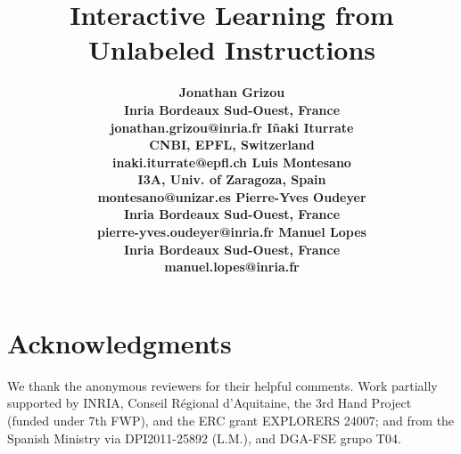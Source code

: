 \documentclass[]{article}
\title{Interactive Learning from Unlabeled Instructions}
\author{
\bf{Jonathan Grizou} \\ Inria Bordeaux Sud-Ouest, France \\ jonathan.grizou@inria.fr
\And \bf{I\~naki Iturrate} \\ CNBI, EPFL, Switzerland \\ inaki.iturrate@epfl.ch
\AND \bf{Luis Montesano} \\ I3A, Univ. of Zaragoza, Spain \\ montesano@unizar.es
\And \bf{Pierre-Yves Oudeyer} \\ Inria Bordeaux Sud-Ouest, France \\ pierre-yves.oudeyer@inria.fr
\And \bf{Manuel Lopes} \\ Inria Bordeaux Sud-Ouest, France \\ manuel.lopes@inria.fr
}
\begin{document}
\maketitle
\begin{abstract}

\end{abstract}



% 





\section*{Acknowledgments}
We thank the anonymous reviewers for their helpful comments. Work partially supported by INRIA, Conseil R\'egional d'Aquitaine, the 3rd Hand Project (funded under 7th FWP), and the ERC grant EXPLORERS 24007; and from the Spanish Ministry via DPI2011-25892 (L.M.), and DGA-FSE grupo T04.




\end{document}

